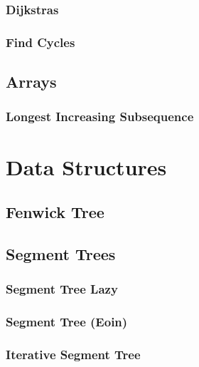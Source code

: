 \documentclass[twocolumn, landscape]{report}
\begin{document}
            \subsection{Dijkstras}
            
            \subsection{Find Cycles}
            

        \section{Arrays}
            \subsection{Longest Increasing Subsequence}
            

    \chapter*{Data Structures}
        \section{Fenwick Tree}
        
        \section{Segment Trees}
            \subsection{Segment Tree Lazy}
            
            \subsection{Segment Tree (Eoin)}
            
            \subsection{Iterative Segment Tree}
            
\end{document}
